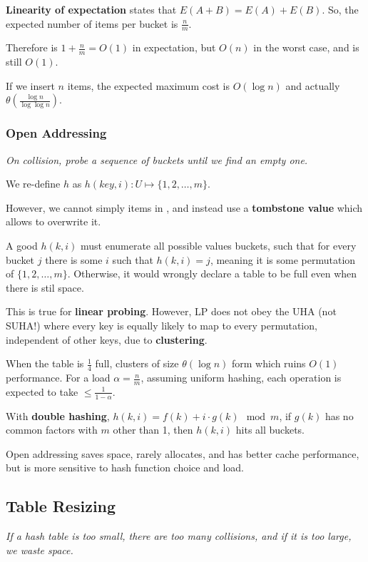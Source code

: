 \textbf{Linearity of expectation} states that $E(A + B) = E(A) + E(B)$.
So, the expected number of items per bucket is $\frac{n}{m}$.

Therefore  is $1 + \frac{n}{m} = O(1)$ in expectation, but $O(n)$ in the worst case, and  is still $O(1)$.

If we insert $n$ items, the expected maximum cost is $O(\log n)$ and actually $\theta(\frac{\log n}{\log \log n})$.

\subsubsection{Open Addressing}
\emph{On collision, probe a sequence of buckets until we find an empty one.}

We re-define $h$ as $h(key, i) : U \mapsto \{ 1, 2, \dots, m \}$.

However, we cannot simply  items in , and instead use a \textbf{tombstone value}
which allows  to overwrite it.

A good $h(k, i)$ must enumerate all possible values buckets, such that for every bucket $j$ there is some $i$ such that $h(k, i) = j$,
meaning it is some permutation of $\{ 1, 2, \dots, m \}$.
Otherwise, it would wrongly declare a table to be full even when there is stil space.

This is true for \textbf{linear probing}.
However, LP does not obey the UHA (not SUHA!) where every key is equally likely to map to every permutation,
independent of other keys, due to \textbf{clustering}.

When the table is $\frac{1}{4}$ full, clusters of size $\theta(\log n)$ form which ruins $O(1)$ performance.
For a load $\alpha = \frac{n}{m}$, assuming uniform hashing, each operation is expected to take $\leq \frac{1}{1 - \alpha}$.

With \textbf{double hashing}, $h(k, i) = f(k) + i \cdot g(k) \!\!\! \mod{m}$, if $g(k)$ has no common factors with $m$ other than 1,
then $h(k, i)$ hits all buckets.

Open addressing saves space, rarely allocates, and has better cache performance,
but is more sensitive to hash function choice and load.

\subsection{Table Resizing}
\emph{If a hash table is too small, there are too many collisions, and if it is too large, we waste space.}

